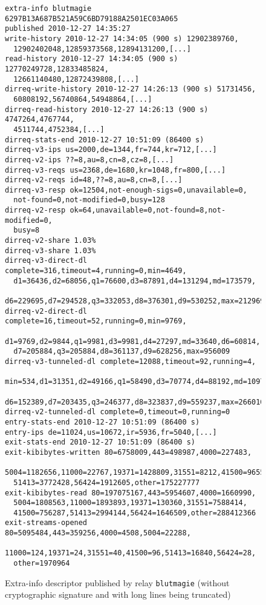 \documentclass{article}
\begin{document}
\begin{figure}
\begin{verbatim}
extra-info blutmagie 6297B13A687B521A59C6BD79188A2501EC03A065
published 2010-12-27 14:35:27
write-history 2010-12-27 14:34:05 (900 s) 12902389760,
  12902402048,12859373568,12894131200,[...]
read-history 2010-12-27 14:34:05 (900 s) 12770249728,12833485824,
  12661140480,12872439808,[...]
dirreq-write-history 2010-12-27 14:26:13 (900 s) 51731456,
  60808192,56740864,54948864,[...]
dirreq-read-history 2010-12-27 14:26:13 (900 s) 4747264,4767744,
  4511744,4752384,[...]
dirreq-stats-end 2010-12-27 10:51:09 (86400 s)
dirreq-v3-ips us=2000,de=1344,fr=744,kr=712,[...]
dirreq-v2-ips ??=8,au=8,cn=8,cz=8,[...]
dirreq-v3-reqs us=2368,de=1680,kr=1048,fr=800,[...]
dirreq-v2-reqs id=48,??=8,au=8,cn=8,[...]
dirreq-v3-resp ok=12504,not-enough-sigs=0,unavailable=0,
  not-found=0,not-modified=0,busy=128
dirreq-v2-resp ok=64,unavailable=0,not-found=8,not-modified=0,
  busy=8
dirreq-v2-share 1.03%
dirreq-v3-share 1.03%
dirreq-v3-direct-dl complete=316,timeout=4,running=0,min=4649,
  d1=36436,d2=68056,q1=76600,d3=87891,d4=131294,md=173579,
  d6=229695,d7=294528,q3=332053,d8=376301,d9=530252,max=2129698
dirreq-v2-direct-dl complete=16,timeout=52,running=0,min=9769,
  d1=9769,d2=9844,q1=9981,d3=9981,d4=27297,md=33640,d6=60814,
  d7=205884,q3=205884,d8=361137,d9=628256,max=956009
dirreq-v3-tunneled-dl complete=12088,timeout=92,running=4,
  min=534,d1=31351,d2=49166,q1=58490,d3=70774,d4=88192,md=109778,
  d6=152389,d7=203435,q3=246377,d8=323837,d9=559237,max=26601000
dirreq-v2-tunneled-dl complete=0,timeout=0,running=0
entry-stats-end 2010-12-27 10:51:09 (86400 s)
entry-ips de=11024,us=10672,ir=5936,fr=5040,[...]
exit-stats-end 2010-12-27 10:51:09 (86400 s)
exit-kibibytes-written 80=6758009,443=498987,4000=227483,
  5004=1182656,11000=22767,19371=1428809,31551=8212,41500=965584,
  51413=3772428,56424=1912605,other=175227777
exit-kibibytes-read 80=197075167,443=5954607,4000=1660990,
  5004=1808563,11000=1893893,19371=130360,31551=7588414,
  41500=756287,51413=2994144,56424=1646509,other=288412366
exit-streams-opened 80=5095484,443=359256,4000=4508,5004=22288,
  11000=124,19371=24,31551=40,41500=96,51413=16840,56424=28,
  other=1970964
\end{verbatim}
\vspace{-1em}
\caption{Extra-info descriptor published by relay \texttt{blutmagie}
(without cryptographic signature and with long lines being truncated)}
\label{fig:extrainfo}
\end{figure}
\end{document}
